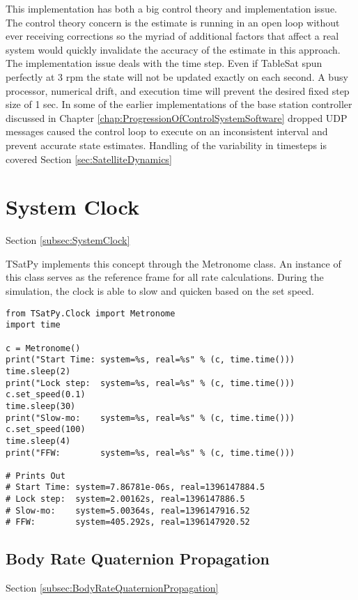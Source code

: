 This implementation has both a big control theory and implementation issue.  The control theory concern is the estimate is running in an open loop without ever receiving corrections so the myriad of additional factors that affect a real system would quickly invalidate the accuracy of the estimate in this approach.  The implementation issue deals with the time step.  Even if TableSat spun perfectly at 3 rpm the state will not be updated exactly on each second.  A busy processor, numerical drift, and execution time will prevent the desired fixed step size of 1 sec.  In some of the earlier implementations of the base station controller discussed in Chapter \ref{chap:ProgressionOfControlSystemSoftware} dropped UDP messages caused the control loop to execute on an inconsistent interval and prevent accurate state estimates.  Handling of the variability in timesteps is covered Section \ref{sec:SatelliteDynamics}

\section{System Clock}
\label{sec:Implementation-SystemClock}

Section \ref{subsec:SystemClock}

TSatPy implements this concept through the Metronome class.  An instance of this class serves as the reference frame for all rate calculations.  During the simulation, the clock is able to slow and quicken based on the set speed.

\begin{singlespace}
  \begin{verbatim}
from TSatPy.Clock import Metronome
import time

c = Metronome()
print("Start Time: system=%s, real=%s" % (c, time.time()))
time.sleep(2)
print("Lock step:  system=%s, real=%s" % (c, time.time()))
c.set_speed(0.1)
time.sleep(30)
print("Slow-mo:    system=%s, real=%s" % (c, time.time()))
c.set_speed(100)
time.sleep(4)
print("FFW:        system=%s, real=%s" % (c, time.time()))

# Prints Out
# Start Time: system=7.86781e-06s, real=1396147884.5
# Lock step:  system=2.00162s, real=1396147886.5
# Slow-mo:    system=5.00364s, real=1396147916.52
# FFW:        system=405.292s, real=1396147920.52
  \end{verbatim}
  \nocite{minted}
\end{singlespace}

\subsection{Body Rate Quaternion Propagation}
\label{subsec:Implementation-BodyRateQuaternionPropagation}
Section \ref{subsec:BodyRateQuaternionPropagation}

